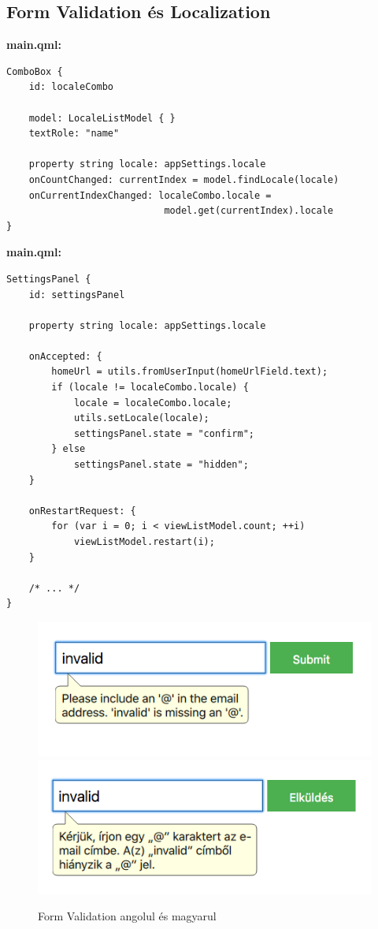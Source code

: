 \documentclass[12pt]{report}
\begin{document}
\subsection{Form Validation és Localization}

\noindent
\textbf{main.qml:}
\begin{verbatim}
ComboBox {
    id: localeCombo

    model: LocaleListModel { }
    textRole: "name"

    property string locale: appSettings.locale
    onCountChanged: currentIndex = model.findLocale(locale)
    onCurrentIndexChanged: localeCombo.locale =
                            model.get(currentIndex).locale
}
\end{verbatim}

\noindent
\textbf{main.qml:}
\begin{verbatim}
SettingsPanel {
    id: settingsPanel

    property string locale: appSettings.locale

    onAccepted: {
        homeUrl = utils.fromUserInput(homeUrlField.text);
        if (locale != localeCombo.locale) {
            locale = localeCombo.locale;
            utils.setLocale(locale);
            settingsPanel.state = "confirm";
        } else
            settingsPanel.state = "hidden";
    }

    onRestartRequest: {
        for (var i = 0; i < viewListModel.count; ++i)
            viewListModel.restart(i);
    }

    /* ... */
}
\end{verbatim}

\begin{figure}[H]
    \centering
    \includegraphics[scale=0.44]{validation-message-english}
    \includegraphics[scale=0.44]{validation-message-magyar}
    \caption{
        \label{fig:validation-message-localization}
        Form Validation angolul és magyarul
    }
\end{figure}
\end{document}
